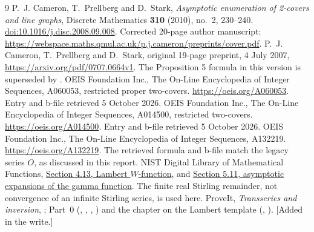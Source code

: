 \begin{thebibliography}{9}
 P.~J. Cameron, T.~Prellberg and D.~Stark,
\emph{Asymptotic enumeration of 2-covers and line graphs}, Discrete Mathematics \textbf{310} (2010), no.~2, 230--240.
\href{https://doi.org/10.1016/j.disc.2008.09.008}{doi:10.1016/j.disc.2008.09.008}.
Corrected 20-page author manuscript:
\url{https://webspace.maths.qmul.ac.uk/p.j.cameron/preprints/cover.pdf}.
 P.~J. Cameron, T.~Prellberg and D.~Stark,
original 19-page preprint, 4 July 2007,
\url{https://arxiv.org/pdf/0707.0664v1}.
The Proposition 5 formula in this version is superseded by \cite{cps}.
 OEIS Foundation Inc., The On-Line Encyclopedia of Integer Sequences, A060053, restricted proper two-covers.
\url{https://oeis.org/A060053}.
Entry and b-file retrieved 5 October 2026.
 OEIS Foundation Inc., The On-Line Encyclopedia of Integer Sequences, A014500, restricted two-covers.
\url{https://oeis.org/A014500}.
Entry and b-file retrieved 5 October 2026.
 OEIS Foundation Inc., The On-Line Encyclopedia of Integer Sequences, A132219.
\url{https://oeis.org/A132219}.
The retrieved formula and b-file match the legacy series $O$, as discussed in this report.
 NIST Digital Library of Mathematical Functions,
\href{https://dlmf.nist.gov/4.13}{Section 4.13, Lambert $W$-function}, and
\href{https://dlmf.nist.gov/5.11}{Section 5.11, asymptotic expansions of the gamma function}.
The finite real Stirling remainder, not convergence of an infinite Stirling series, is used here.
 ProveIt, \emph{Transseries and inversion}, ; Part~0 (, , , ) and the chapter on the Lambert template (, ). [Added in the write.]
\end{thebibliography}

